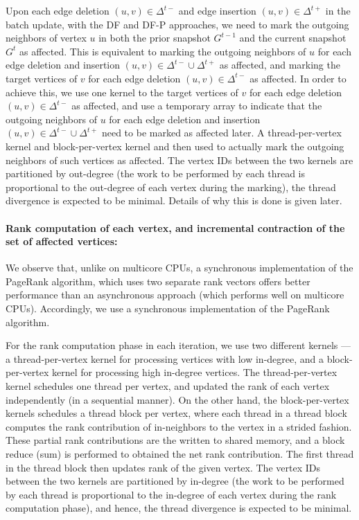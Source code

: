 Upon each edge deletion $(u, v) \in \Delta^{t-}$ and edge insertion $(u, v) \in \Delta^{t+}$ in the batch update, with the DF and DF-P approaches, we need to mark the outgoing neighbors of vertex $u$ in both the prior snapshot $G^{t-1}$ and the current snapshot $G^t$ as affected. This is equivalent to marking the outgoing neighbors of $u$ for each edge deletion and insertion $(u, v) \in \Delta^{t-} \cup\Delta^{t+}$ as affected, and marking the target vertices of $v$ for each edge deletion $(u, v) \in \Delta^{t-}$ as affected. In order to achieve this, we use one kernel to the target vertices of $v$ for each edge deletion $(u, v) \in \Delta^{t-}$ as affected, and use a temporary array to indicate that the outgoing neighbors of $u$ for each edge deletion and insertion $(u, v) \in \Delta^{t-} \cup\Delta^{t+}$ need to be marked as affected later. A thread-per-vertex kernel and block-per-vertex kernel and then used to actually mark the outgoing neighbors of such vertices as affected. The vertex IDs between the two kernels are partitioned by out-degree (the work to be performed by each thread is proportional to the out-degree of each vertex during the marking), the thread divergence is expected to be minimal. Details of why this is done is given later.

\paragraph{Rank computation of each vertex, and incremental contraction of the set of affected vertices:}

We observe that, unlike on multicore CPUs, a synchronous implementation of the PageRank algorithm, which uses two separate rank vectors offers better performance than an asynchronous approach (which performs well on multicore CPUs). Accordingly, we use a synchronous implementation of the PageRank algorithm.

For the rank computation phase in each iteration, we use two different kernels --- a thread-per-vertex kernel for processing vertices with low in-degree, and a block-per-vertex kernel for processing high in-degree vertices. The thread-per-vertex kernel schedules one thread per vertex, and updated the rank of each vertex independently (in a sequential manner). On the other hand, the block-per-vertex kernels schedules a thread block per vertex, where each thread in a thread block computes the rank contribution of in-neighbors to the vertex in a strided fashion. These partial rank contributions are the written to shared memory, and a block reduce (sum) is performed to obtained the net rank contribution. The first thread in the thread block then updates rank of the given vertex. The vertex IDs between the two kernels are partitioned by in-degree (the work to be performed by each thread is proportional to the in-degree of each vertex during the rank computation phase), and hence, the thread divergence is expected to be minimal.

